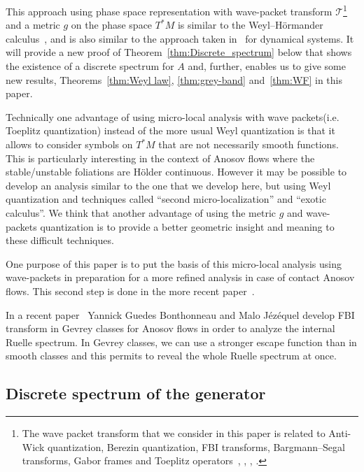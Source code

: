 \documentclass[10pt]{amsart}
\theoremstyle{definition}\newtheorem{defi}[theo]{Definition}\newtheorem{rema}[theo]{Remark}\newtheorem{exam}[theo]{Example}\newtheorem{exem}[theo]{Example}\newtheorem{nota}[theo]{Notation}
\newcommand{\clT}{\mathcal{T}}
\begin{document}
This approach using phase space representation with wave-packet transform $\clT$\footnote{The wave packet transform that we consider in this paper is related to Anti-Wick quantization, Berezin quantization, FBI transforms, Bargmann--Segal transforms, Gabor frames and Toeplitz operators~\cite[Chap.~3]{martinez-01}, \cite{wunsh-zworski_01}, \cite[Chap.~13]{zworski_book_2012}, \cite{sjostrand_hitrick_07,sjostrand_density_resonances_96}.} and a metric $g$ on the phase space $T^{*}M$ is similar to the Weyl--H\"ormander calculus~\cite{hormander1979weyl}, \cite[Section~2.2]{lerner2011metrics} and is also similar to the approach taken in~\cite{faure-tsujii_prequantum_maps_12,faure-tsujii_anosov_flows_13,tsujii_08,tsujii_FBI_10} for dynamical systems. It will provide a new proof of Theorem~\ref{thm:Discrete_spectrum} below that shows the existence of a discrete spectrum for $A$ and, further, enables us to give some new results, Theorems~\ref{thm:Weyl law}, \ref{thm:grey-band} and~\ref{thm:WF} in this paper.

Technically one advantage of using micro-local analysis with wave packets\linebreak (i.e. Toeplitz quantization) instead of the more usual Weyl quantization is that it allows to consider symbols on $T^{*}M$ that are not necessarily smooth functions. This is particularly interesting in the context of Anosov flows where the stable/unstable foliations are H\"older continuous. However it may be possible to develop an analysis similar to the one that we develop here, but using Weyl quantization and techniques called ``second micro-localization'' and ``exotic calculus''. We think that another advantage of using the metric $g$ and wave-packets quantization is to provide a better geometric insight and meaning to these difficult techniques.

One purpose of this paper is to put the basis of this micro-local analysis using wave-packets in preparation for a more refined analysis in case of contact Anosov flows. This second step is done in the more recent paper~\cite{faure-tsujii_anosov_flows_16}.

In a recent paper~\cite{bonthonneau2020fbi} Yannick Guedes Bonthonneau and Malo Jézéquel develop FBI transform in Gevrey classes for Anosov flows in order to analyze the internal Ruelle spectrum. In Gevrey classes, we can use a stronger escape function than in smooth classes and this permits to reveal the whole Ruelle spectrum at once.

\subsection*{Discrete spectrum of the generator}
\end{document}
